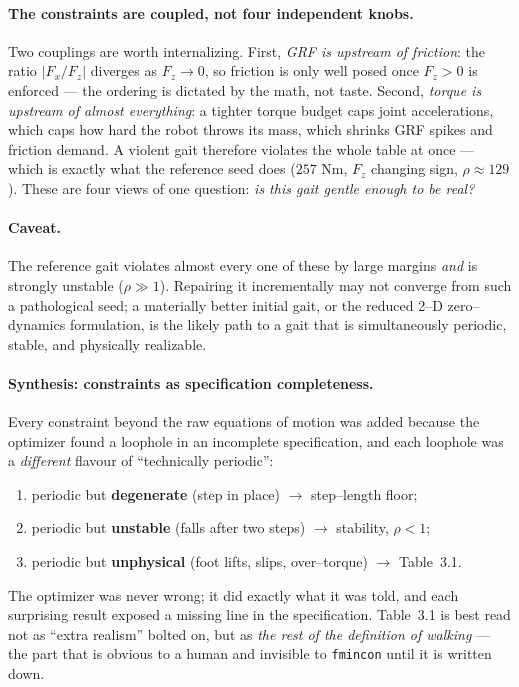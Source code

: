 \documentclass[11pt,a4paper]{article}
\newcommand{\code}[1]{\texttt{#1}}          %
\begin{document}
\paragraph{The constraints are coupled, not four independent knobs.} Two
couplings are worth internalizing. First, \emph{GRF is upstream of friction}:
the ratio $|F_x/F_z|$ diverges as $F_z\!\to\!0$, so friction is only well posed
once $F_z>0$ is enforced --- the ordering is dictated by the math, not taste.
Second, \emph{torque is upstream of almost everything}: a tighter torque budget
caps joint accelerations, which caps how hard the robot throws its mass, which
shrinks GRF spikes and friction demand. A violent gait therefore violates the
whole table at once --- which is exactly what the reference seed does ($257$ Nm,
$F_z$ changing sign, $\rho\!\approx\!129$). These are four views of one question:
\emph{is this gait gentle enough to be real?}

\paragraph{Caveat.} The reference gait violates almost every one of these by
large margins \emph{and} is strongly unstable ($\rho\gg1$). Repairing it
incrementally may not converge from such a pathological seed; a materially
better initial gait, or the reduced 2--D zero--dynamics formulation, is the
likely path to a gait that is simultaneously periodic, stable, and physically
realizable.

\paragraph{Synthesis: constraints as specification completeness.} Every
constraint beyond the raw equations of motion was added because the optimizer
found a loophole in an incomplete specification, and each loophole was a
\emph{different} flavour of ``technically periodic'':
\begin{enumerate}
  \item periodic but \textbf{degenerate} (step in place) $\rightarrow$ step--length floor;
  \item periodic but \textbf{unstable} (falls after two steps) $\rightarrow$ stability, $\rho<1$;
  \item periodic but \textbf{unphysical} (foot lifts, slips, over--torque) $\rightarrow$ Table~3.1.
\end{enumerate}
The optimizer was never wrong; it did exactly what it was told, and each
surprising result exposed a missing line in the specification. Table~3.1 is
best read not as ``extra realism'' bolted on, but as \emph{the rest of the
definition of walking} --- the part that is obvious to a human and invisible to
\code{fmincon} until it is written down.
\end{document}
